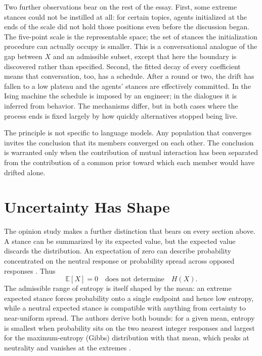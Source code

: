 \documentclass[11pt]{article}
\theoremstyle{definition}
\theoremstyle{remark}
\newcommand{\E}{\mathbb{E}}
\begin{document}
Two further observations bear on the rest of the essay. First, some extreme stances could not be instilled at all: for certain topics, agents initialized at the ends of the scale did not hold those positions even before the discussion began. The five-point scale is the representable space; the set of stances the initialization procedure can actually occupy is smaller. This is a conversational analogue of the gap between $X$ and an admissible subset, except that here the boundary is discovered rather than specified. Second, the fitted decay of every coefficient means that conversation, too, has a schedule. After a round or two, the drift has fallen to a low plateau and the agents' stances are effectively committed. In the Ising machine the schedule is imposed by an engineer; in the dialogues it is inferred from behavior. The mechanisms differ, but in both cases where the process ends is fixed largely by how quickly alternatives stopped being live.

The principle is not specific to language models. Any population that converges invites the conclusion that its members converged on each other. The conclusion is warranted only when the contribution of mutual interaction has been separated from the contribution of a common prior toward which each member would have drifted alone.

\section{Uncertainty Has Shape}

The opinion study makes a further distinction that bears on every section above. A stance can be summarized by its expected value, but the expected value discards the distribution. An expectation of zero can describe probability concentrated on the neutral response or probability spread across opposed responses \cite{brockers2026}. Thus
\begin{equation}
\E[X] = 0 \quad \text{does not determine} \quad H(X).
\end{equation}
The admissible range of entropy is itself shaped by the mean: an extreme expected stance forces probability onto a single endpoint and hence low entropy, while a neutral expected stance is compatible with anything from certainty to near-uniform spread. The authors derive both bounds: for a given mean, entropy is smallest when probability sits on the two nearest integer responses and largest for the maximum-entropy (Gibbs) distribution with that mean, which peaks at neutrality and vanishes at the extremes \cite{brockers2026}.
\end{document}
